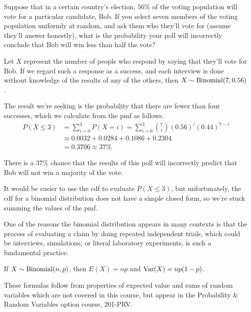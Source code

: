 \begin{example}Suppose that in a certain country's election, $56\%$ of the voting population will vote for a particular candidate, Bob. If you select seven members of the voting population uniformly at random, and ask them who they'll vote for (assume they'll answer honestly), what is the probability your poll will incorrectly conclude that Bob will win less than half the vote?

Let $X$ represent the number of people who respond by saying that they'll vote for Bob. If we regard such a response as a success, and each interview is done without knowledge of the results of any of the others, then $X \sim \operatorname{Binomial}(7, 0.56)$.

The result we're seeking is the probability that there are fewer than four successes, which we calculate from the pmf as follows.
$$\begin{aligned}P(X \leq 3) &= \sum_{i=0}^{3} P(X = i) = \sum_{i=0}^{3} \binom{7}{i}(0.56)^{i}(0.44)^{7-i} \\
&\approx 0.0032 + 0.0284 + 0.1086 + 0.2304 \\
&= 0.3706 \approx 37\%\end{aligned}$$

There is a $37\%$ chance that the results of this poll will incorrectly predict that Bob will not win a majority of the vote.
\end{example}

\begin{remark}
It would be easier to use the cdf to evaluate $P(X \leq 3)$, but unfortunately, the cdf for a binomial distribution does not have a simple closed form, so we're stuck summing the values of the pmf.
\end{remark}

One of the reasons the binomial distribution appears in many contexts is that the process of evaluating a claim by doing repeated independent trials, which could be interviews, simulations, or literal laboratory experiments, is such a fundamental practice.

\begin{theorem}If $X \sim \operatorname{Binomial}(n,p)$, then $E(X) = np$ and $\operatorname{Var}(X) = np(1-p)$.
\end{theorem}

These formulas follow from properties of expected value and sums of random variables which are not covered in this course, but appear in the Probability \& Random Variables option course, 201-PRV.

